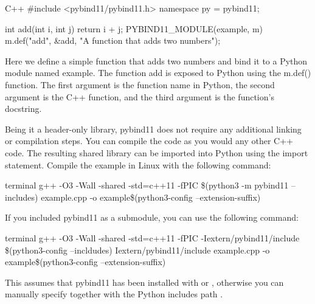 \begin{neonlisting}[language=C++]{C++}
    #include <pybind11/pybind11.h>
    namespace py = pybind11;

    int add(int i, int j) {
        return i + j;
    }
    PYBIND11_MODULE(example, m) {
        m.def("add", &add, "A function that adds two numbers");
    }
\end{neonlisting}

Here we define a simple function that adds two numbers and bind it to a Python module named example. The function add is exposed to Python using the m.def() function. The first argument is the function name in Python, the second argument is the C++ function, and the third argument is the function's docstring.


Being it a header-only library, pybind11 does not require any additional linking or compilation steps. You can compile the code as you would any other C++ code. The resulting shared library can be imported into Python using the import statement.
Compile the example in Linux with the following command:

\begin{neonlisting}{terminal}
    g++ -O3 -Wall -shared -std=c++11 -fPIC 
    \$(python3 -m pybind11 --includes)
    example.cpp -o example\$(python3-config --extension-suffix)
\end{neonlisting}

If you included pybind11 as a submodule, you can use the following command: 

\begin{neonlisting}{terminal}
    g++ -O3 -Wall -shared -std=c++11 -fPIC 
    -Iextern/pybind11/include 
    \$(python3-config --incldudes) Iextern/pybind11/include
    example.cpp -o example\$(python3-config --extension-suffix)
\end{neonlisting}

This assumes that pybind11 has been installed with  or , otherwise you can manually specify
 together with the Python includes path .

